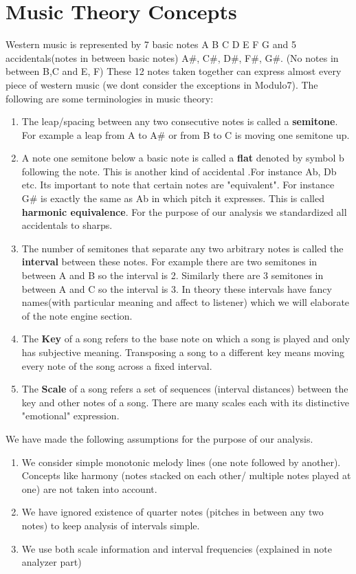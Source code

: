 \documentclass[letterpaper, 11pt]{article}
\begin{document}
\section*{Music Theory Concepts}
Western music is represented by 7 basic notes A B C D E F G and 5 accidentals(notes in between basic notes) A\#, C\#, D\#, F\#, G\#. (No notes in between B,C and E, F) These 12 notes taken together can express almost every piece of western music (we dont consider the exceptions in Modulo7). The following are some terminologies in music theory:
\begin{enumerate}
\item The leap/spacing between any two consecutive notes is called a \textbf{semitone}. For example a leap from A to A\# or from B to C is moving one semitone up. 
\item A note one semitone below a basic note is called a \textbf{flat} denoted by symbol b following the note. This is another kind of accidental .For instance Ab, Db etc. Its important to note that certain notes are "equivalent". For instance G\# is exactly the same as Ab in which pitch it expresses. This is called \textbf{harmonic equivalence}. For the purpose of our analysis we standardized all accidentals to sharps. 
\item The number of semitones that separate any two arbitrary notes is called the \textbf{interval} between these notes. For example there are two semitones in between A and B so the interval is 2. Similarly there are 3 semitones in between A and C so the interval is 3. In theory these intervals have fancy names(with particular meaning and affect to listener) which we will elaborate of the note engine section.
\item The \textbf{Key} of a song refers to the base note on which a song is played and only has subjective meaning. Transposing a song to a different key means moving every note of the song across a fixed interval.
\item The \textbf{Scale} of a song refers a set of sequences (interval distances) between the key and other notes of a song. There are many scales each with its distinctive "emotional" expression.
\end{enumerate} 

We have made the following assumptions for the purpose of our analysis.
\begin{enumerate}
\item We consider simple monotonic melody lines (one note followed by another). Concepts like harmony (notes stacked on each other/ multiple notes played at one) are not taken into account.
\item We have ignored existence of quarter notes (pitches in between any two notes) to keep analysis of intervals simple.
\item We use both scale information and interval frequencies (explained in note analyzer part)
\end{enumerate}
\end{document}
